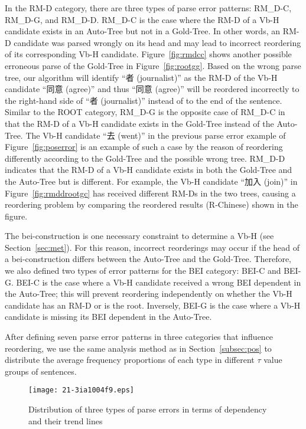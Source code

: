 \documentclass[english]{jnlp_1.4}
\begin{document}
In the RM-D category, there are three types of parse error patterns: RM\_D-C,
RM\_D-G, and RM\_D-D. RM\_D-C is the case where the RM-D of a Vb-H candidate exists 
in an Auto-Tree but not in a Gold-Tree. In other words, an RM-D candidate was 
parsed wrongly on its head and may lead to incorrect reordering of its 
corresponding Vb-H candidate. 
Figure~\ref{fig:rmdcc} shows another possible erroneous parse of the Gold-Tree 
in Figure~\ref{fig:rootgg}. Based on the wrong parse tree, our algorithm will 
identify ``者 (journalist)'' as the RM-D of the Vb-H candidate ``同意 (agree)'' 
and thus ``同意 (agree)'' will be reordered incorrectly to the right-hand side 
of ``者 (journalist)'' instead of to the end of the sentence. Similar to the ROOT 
category, RM\_D-G is the opposite case of RM\_D-C in that the RM-D of a Vb-H candidate 
exists in the Gold-Tree instead of the Auto-Tree. The Vb-H candidate ``去 (went)'' 
in the previous parse error example of Figure~\ref{fig:poserror} is an example 
of such a case by the reason of reordering differently according to the Gold-Tree and 
the possible wrong tree. RM\_D-D indicates that the RM-D of a Vb-H candidate exists 
in both the Gold-Tree and the Auto-Tree but is different. For example, the Vb-H candidate 
``加入 (join)'' in Figure~\ref{fig:rmddrootgc} has received different RM-Ds 
in the two trees, causing a reordering problem by comparing the reordered results
(R-Chinese) shown in the figure.

The bei-construction is one necessary constraint to determine a Vb-H (see Section~\ref{sec:met}).
For this reason, incorrect reorderings may occur if the head of a bei-construction
differs between the Auto-Tree and the Gold-Tree.
Therefore, we also defined two types of error patterns for the BEI 
category: BEI-C and BEI-G. BEI-C is the case where a Vb-H candidate received a 
wrong BEI dependent in the Auto-Tree; this will prevent reordering independently 
on whether the Vb-H candidate has an RM-D or is the root. Inversely, BEI-G is the 
case where a Vb-H candidate is missing its BEI dependent in the Auto-Tree.

After defining seven parse error patterns in three categories that influence 
reordering, we use the same analysis method as in Section~\ref{subsec:pos} to 
distribute the average frequency proportions of each type in different $\tau$ 
value groups of sentences.

\begin{figure}[b]
\begin{center}
\texttt{[image: 21-3ia1004f9.eps]}
\end{center}
\caption{Distribution of three types of parse errors in terms of dependency and their trend lines}
\label{fig:error}
\end{figure}
\end{document}
